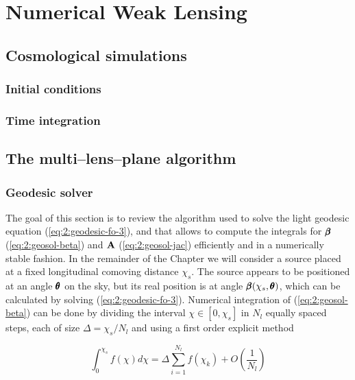 
\chapter{Numerical Weak Lensing}
\lhead[\fancyplain{}{\thepage}]{\fancyplain{}{\rightmark}}
 \thispagestyle{plain}
\setlength{\parindent}{10mm}


\section{Cosmological simulations}

\subsection{Initial conditions}

\subsection{Time integration}

\section{The multi--lens--plane algorithm}

\subsection{Geodesic solver}
The goal of this section is to review the algorithm used to solve the light geodesic equation (\ref{eq:2:geodesic-fo-3}), and that allows to compute the integrals for $\pmb{\beta}$ (\ref{eq:2:geosol-beta}) and $\mathbf{A}$ (\ref{eq:2:geosol-jac}) efficiently and in a numerically stable fashion. In the remainder of the Chapter we will consider a source placed at a fixed longitudinal comoving distance $\chi_s$. The source appears to be positioned at an angle $\pmb{\theta}$ on the sky, but its real position is at angle $\pmb{\beta}(\chi_s,\pmb{\theta})$, which can be calculated by solving (\ref{eq:2:geodesic-fo-3}). Numerical integration of (\ref{eq:2:geosol-beta}) can be done by dividing the interval $\chi\in[0,\chi_s]$ in $N_l$ equally spaced steps, each of size $\Delta = \chi_s/N_l$ and using a first order explicit method

\begin{equation}
\label{eq:3:int-fo}
\int_0^{\chi_s} f(\chi)d\chi = \Delta\sum_{i=1}^{N_l}f(\chi_k) + O\left(\frac{1}{N_l}\right)
\end{equation} 

